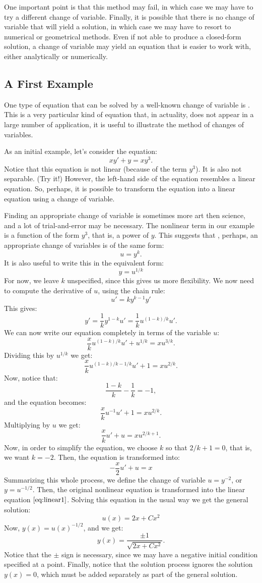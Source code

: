 \documentclass{ximera}
\begin{document}
One important point is that this method may fail, in which case we may have to try a different change of variable. Finally, it is possible that there is no change of variable that will yield a solution, in which case we may have to resort to numerical or geometrical methods. Even if not able to produce a closed-form solution, a change of variable may yield an equation that is easier to work with, either analytically or numerically.

\subsection*{A First Example}
One type of equation that can be solved by a well-known change of variable is . This is a very particular kind of equation that, in actuality, does not appear in a large number of application, it is useful to illustrate the method of changes of variables.

As an initial example, let's consider the equation:
\[
xy'+y=xy^3.
\]
Notice that this equation is not linear (because of the term $y^3$). It is also not separable. (Try it!) However, the left-hand side of the equation resembles a linear equation. So, perhaps, it is possible to transform the equation into a linear equation using a change of variable.

Finding an appropriate change of variable is sometimes more art then science, and a lot of trial-and-error may be necessary. The nonlinear term in our example is a function of the form $y^3$, that is, a power of $y$. This suggests that , perhaps, an appropriate change of variables is of the same form:
\[
u=y^k.
\]
It is also useful to write this in the equivalent form:
\[
y=u^{1/k}
\]
For now, we leave $k$ unspecified, since this gives us more flexibility. We now need to compute the derivative of $u$, using the chain rule:
\[
u'=ky^{k-1}y'
\]
This gives:
\[
y'=\frac{1}{k}y^{1-k}u'=\frac{1}{k}u^{(1-k)/k}u'.
\]
We can now write our equation completely in terms of the variable $u$:
\[
\frac{x}{k}u^{(1-k)/k}u'+u^{1/k}=xu^{3/k}.
\]
Dividing this by $u^{1/k}$ we get:
\[
\frac{x}{k}u^{(1-k)/k-1/k}u'+1=xu^{2/k}.
\]
Now, notice that:
\[
\frac{1-k}{k}-\frac{1}{k}=-1,
\]
and the equation becomes:
\[
\frac{x}{k}u^{-1}u'+1=xu^{2/k}.
\]
Multiplying by $u$ we get:
\[
\frac{x}{k}u'+u=xu^{2/k+1}.
\]
Now, in order to simplify the equation, we choose $k$ so that $2/k+1=0$, that is, we want $k=-2$. Then, the equation is transformed into:
\begin{equation}\label{eq:linear1}
-\frac{x}{2}u'+u=x
\end{equation}
Summarizing this whole process, we define the change of variable $u=y^{-2}$, or $y=u^{-1/2}$. Then, the original nonlinear equation is transformed into the linear equation $\eqref{eq:linear1}$. Solving this equation in the usual way we get the general solution:
\[
u(x)=2x+Cx^2
\]
Now, $y(x)=u(x)^{-1/2}$, and we get:
\[
y(x)=\frac{\pm 1}{\sqrt{2x+Cx^2}}.
\]
Notice that the $\pm$ sign is necessary, since we may have a negative initial condition specified at a point. Finally, notice that the solution process ignores the solution $y(x)=0$, which must be added separately as part of the general solution.
\end{document}
